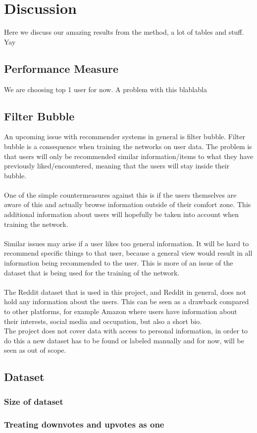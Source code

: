 \chapter{Discussion}

Here we discuss our amazing results from the method, a lot of tables and stuff. Yay


\section{Performance Measure}%
We are choosing top 1 user for now. A problem with this blablabla 


\section{Filter Bubble}
An upcoming issue with recommender systems in general is filter bubble.
Filter bubble is a consequence when training the networks on user data. The problem is that users will only be recommended similar information/items to what they have previously liked/encountered, meaning that the users will stay inside their bubble. 
\\\\
One of the simple countermeasures against this is if the users themselves are aware of this and actually browse information outside of their comfort zone. This additional information about users will hopefully be taken into account when training the network. 
\\\\
Similar issues may arise if a user likes too general information. It will be hard to recommend specific things to that user, because a general view would result in all information being recommended to the user. This is more of an issue of the dataset that is being used for the training of the network. 
\\\\
The Reddit dataset that is used in this project, and Reddit in general, does not hold any information about the users. This can be seen as a drawback compared to other platforms, for example Amazon where users have information about their interests, social media and occupation, but also a short bio. \\
The project does not cover data with access to personal information, in order to do this a new dataset has to be found or labeled manually and for now, will be seen as out of scope.

\section{Dataset}
\subsection{Size of dataset}
\subsection{Treating downvotes and upvotes as one}
